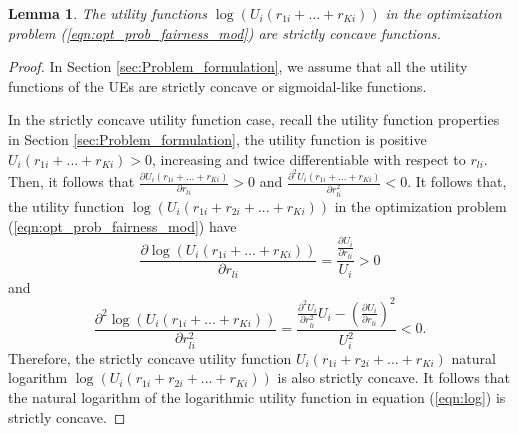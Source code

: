 \documentclass[journal]{IEEEtran} 		\usepackage{amsmath,amssymb}
\newtheorem{lem}[thm]{Lemma}
\begin{document}
\begin{lem}\label{lem:concavity}
The utility functions $\log(U_i(r_{1i} + ... + r_{Ki}))$ in the optimization problem (\ref{eqn:opt_prob_fairness_mod}) are strictly concave functions.
\end{lem}
\begin{proof}
In Section \ref{sec:Problem_formulation}, we assume that all the utility functions of the UEs are strictly concave or sigmoidal-like functions.

In the strictly concave utility function case, recall the utility function properties in Section \ref{sec:Problem_formulation}, the utility function is positive $ U_i(r_{1i} + ... + r_{Ki}) > 0$, increasing and twice differentiable with respect to $r_{li}$. Then, it follows that $\frac{ \partial U_i(r_{1i} + ... + r_{Ki})}{\partial r_{li}} > 0$ and $\frac{\partial^2 U_i(r_{1i}+ ... + r_{Ki})}{\partial r_{li}^2} < 0$. It follows that, the utility function $\log(U_i(r_{1i} + r_{2i} + ... + r_{Ki}))$ in the optimization problem (\ref{eqn:opt_prob_fairness_mod}) have
\begin{equation}\label{eqn:log_first_derivative}
\frac{\partial \log(U_i(r_{1i} + ... + r_{Ki}))}{\partial r_{li}} =  \frac{\frac{\partial U_i}{\partial r_{li}}}{U_i} > 0
\end{equation}
and
\begin{equation}\label{eqn:log_second_derivative}
\frac{\partial ^2\log(U_i(r_{1i} + ... + r_{Ki}))}{\partial r_{li}^2} =  \frac{\frac{\partial^2 U_i}{\partial r_{li}^2}U_i-(\frac{\partial U_i}{\partial r_{li}})^2}{U^2_i} < 0.
\end{equation}
Therefore, the strictly concave utility function $U_i(r_{1i} + r_{2i} + ... + r_{Ki})$ natural logarithm  $\log(U_i(r_{1i} + r_{2i} + ... + r_{Ki}))$ is also strictly concave. It follows that the natural logarithm  of the logarithmic utility function in equation (\ref{eqn:log}) is strictly concave.


\end{proof}
\end{document}
